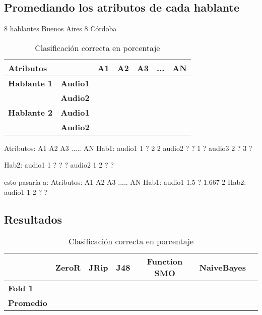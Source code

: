 \subsection{Promediando los atributos de cada hablante}

8 hablantes Buenos Aires
8 Córdoba

\begin{table}[H]
	\centering
	\begin{tabular}{|l|l|ccccc|}
		\hline
		\multicolumn{2}{|l|}{Atributos} & A1 & A2 & A3 & ... & AN \\
		\hline 
		\textbf{Hablante 1} & \textbf{Audio1} & & & & & \\
		& \textbf{Audio2} & & & & & \\
		\hline
		\textbf{Hablante 2} & \textbf{Audio1} & & & & & \\
		& \textbf{Audio2} & & & & & \\
		\hline
	\end{tabular}
	\caption{Clasificación correcta en porcentaje}
	\label{class_corr_en_pct}
\end{table}


Atributos:      A1    A2    A3         .....     AN
Hab1:  audio1   1     ?     2                    2   
       audio2   ?     ?     1                    ?
       audio3   2     ?     3                    ?

Hab2:  audio1   1       ?       ?                      ?
audio2   1       2       ?                      ?

esto pasaría a:
Atributos:                A1    A2    A3         .....     AN
Hab1:  audio1   1.5   ?     1.667                2   
Hab2:  audio1   1      2        ?                     ?

\subsection{Resultados}

\begin{table}[H]
	\centering
	\begin{tabular}{|l|c|c|c|c|c|c|}
		\hline
		\textbf{}  & \textbf{ZeroR} & \textbf{JRip} & \textbf{J48} & \textbf{Function SMO} & \textbf{NaiveBayes} \\ \hline
		\textbf{Fold 1}  &  &  &  &  &  \\ \hline
		\hline \hline
		\textbf{Promedio} &  &  &  &  &  \\ \hline
	\end{tabular}
	\caption{Clasificación correcta en porcentaje}
	\label{class_corr_en_pct}
\end{table}

